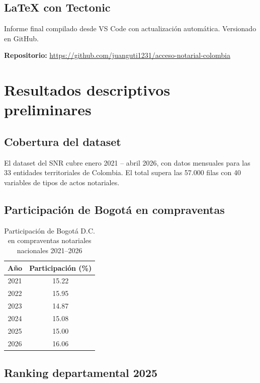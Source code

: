\documentclass{article}
\begin{document}
\subsection{LaTeX con Tectonic}

Informe final compilado desde VS Code con actualización 
automática. Versionado en GitHub.

\textbf{Repositorio:}
\url{https://github.com/juanguti1231/acceso-notarial-colombia}

\newpage
\section{Resultados descriptivos preliminares}

\subsection{Cobertura del dataset}

El dataset del SNR cubre enero 2021 -- abril 2026, 
con datos mensuales para las 33 entidades territoriales 
de Colombia. El total supera las 57.000 filas con 
40 variables de tipos de actos notariales.

\subsection{Participación de Bogotá en compraventas}

\begin{table}[H]
\centering
\begin{tabular}{cc}
\toprule
\textbf{Año} & \textbf{Participación (\%)} \\
\midrule
2021 & 15.22 \\
2022 & 15.95 \\
2023 & 14.87 \\
2024 & 15.08 \\
2025 & 15.00 \\
2026 & 16.06 \\
\bottomrule
\end{tabular}
\caption{Participación de Bogotá D.C. en compraventas 
notariales nacionales 2021--2026}
\end{table}

\subsection{Ranking departamental 2025}
\end{document}
